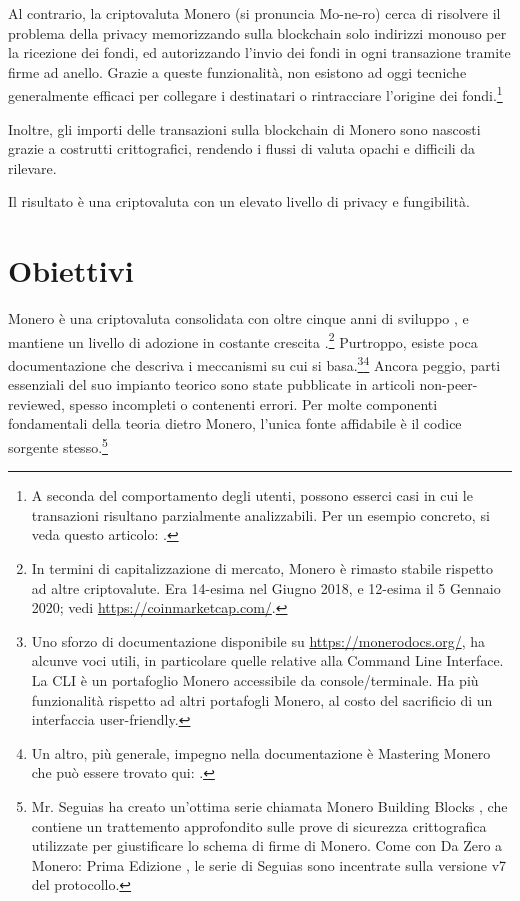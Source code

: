 Al contrario, la criptovaluta Monero (si pronuncia Mo-ne-ro) cerca di risolvere il problema della privacy memorizzando sulla blockchain solo indirizzi monouso per la ricezione dei fondi, ed autorizzando l'invio dei fondi in ogni transazione tramite firme ad anello. Grazie a queste funzionalità, non esistono ad oggi tecniche generalmente efficaci per collegare i destinatari o rintracciare l’origine dei fondi.\footnote{A seconda del comportamento degli utenti, possono esserci casi in cui le transazioni risultano parzialmente analizzabili. Per un esempio concreto, si veda questo articolo:  \cite{monero-ring-heuristics-ryo}.}

Inoltre, gli importi delle transazioni sulla blockchain di Monero sono nascosti grazie a costrutti crittografici, rendendo i flussi di valuta opachi e difficili da rilevare.

Il risultato è una criptovaluta con un elevato livello di privacy e fungibilità.



\section{Obiettivi}
\label{sec:goals}

Monero è una criptovaluta consolidata con oltre cinque anni di sviluppo \cite{bitmonero-launched, monero-history}, e mantiene un livello di adozione in costante crescita \cite{justin-defcon-2019-community-growth}.\footnote{\label{marketcap_note}In termini di capitalizzazione di mercato, Monero è rimasto stabile rispetto ad altre criptovalute. Era 14-esima nel Giugno 2018, e 12-esima il 5 Gennaio 2020; vedi \url{https://coinmarketcap.com/}.} Purtroppo, esiste poca documentazione che descriva i meccanismi su cui si basa.\footnote{Uno sforzo di documentazione disponibile su \url{https://monerodocs.org/}, ha alcunve voci utili, in particolare quelle relative alla Command Line Interface. La CLI è un portafoglio Monero accessibile da console/terminale. Ha più funzionalità rispetto ad altri portafogli Monero, al costo del sacrificio di un interfaccia user-friendly.}\footnote{Un altro, più generale, impegno nella documentazione è Mastering Monero che può essere trovato qui: \cite{mastering-monero}.} Ancora peggio, parti essenziali del suo impianto teorico sono state pubblicate in articoli non-peer-reviewed, spesso incompleti o contenenti errori. Per molte componenti fondamentali della teoria dietro Monero, l’unica fonte affidabile è il codice sorgente stesso.\footnote{Mr. Seguias ha creato un'ottima serie chiamata Monero Building Blocks \cite{monero-building-blocks}, che contiene un trattemento approfondito sulle prove di sicurezza crittografica utilizzate per giustificare lo schema di firme di Monero. Come con Da Zero a Monero: Prima Edizione \cite{ztm-1}, le serie di Seguias sono incentrate sulla versione v7 del protocollo.}

